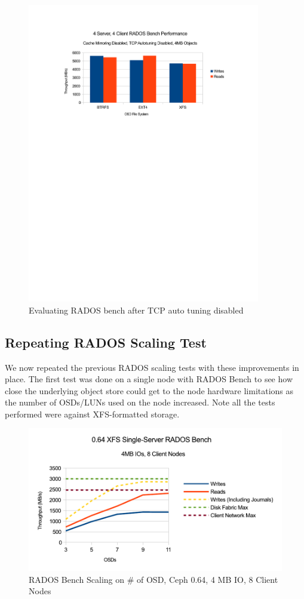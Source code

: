 \documentclass{article}
\begin{document}
\begin{figure}[htb]
\centering
\includegraphics[width=4.0in]{rados-after-ddn-tcptune}
\caption{Evaluating RADOS bench after TCP auto tuning disabled}
\label{fig:rados-tcp-auto-disabled}
\end{figure}




\subsection{Repeating RADOS Scaling Test}

We now repeated the previous RADOS scaling tests with these improvements in place.
The first test was done on a single node with RADOS Bench to see how close the
underlying object store could get to the node hardware limitations as the number
of OSDs/LUNs used on the node increased. Note all the tests performed were against
XFS-formatted storage.

\begin{figure}[htb]
\centering
\includegraphics[width=5in]{rados-064-osd}
\caption{RADOS Bench Scaling on \# of OSD, Ceph 0.64, 4 MB IO, 8 Client Nodes}
\label{fig:rados-064-osd}
\end{figure}
\end{document}
